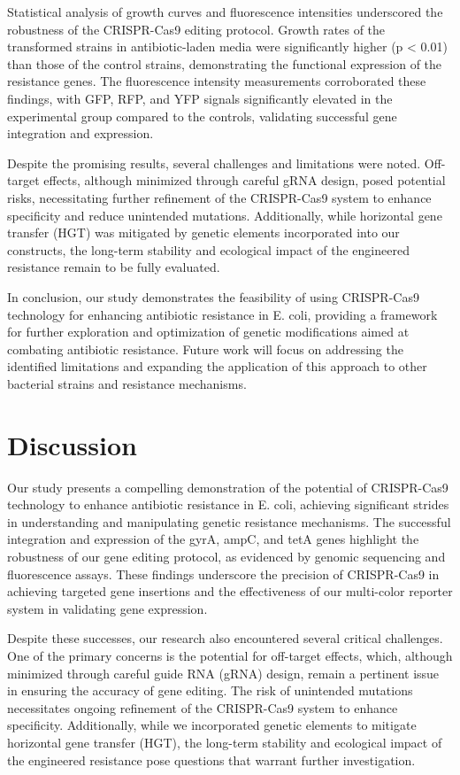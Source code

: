 \documentclass{article}
\begin{document}
Statistical analysis of growth curves and fluorescence intensities underscored the robustness of the CRISPR-Cas9 editing protocol. Growth rates of the transformed strains in antibiotic-laden media were significantly higher (p < 0.01) than those of the control strains, demonstrating the functional expression of the resistance genes. The fluorescence intensity measurements corroborated these findings, with GFP, RFP, and YFP signals significantly elevated in the experimental group compared to the controls, validating successful gene integration and expression.

Despite the promising results, several challenges and limitations were noted. Off-target effects, although minimized through careful gRNA design, posed potential risks, necessitating further refinement of the CRISPR-Cas9 system to enhance specificity and reduce unintended mutations. Additionally, while horizontal gene transfer (HGT) was mitigated by genetic elements incorporated into our constructs, the long-term stability and ecological impact of the engineered resistance remain to be fully evaluated.

In conclusion, our study demonstrates the feasibility of using CRISPR-Cas9 technology for enhancing antibiotic resistance in E. coli, providing a framework for further exploration and optimization of genetic modifications aimed at combating antibiotic resistance. Future work will focus on addressing the identified limitations and expanding the application of this approach to other bacterial strains and resistance mechanisms.

\section{Discussion}
Our study presents a compelling demonstration of the potential of CRISPR-Cas9 technology to enhance antibiotic resistance in E. coli, achieving significant strides in understanding and manipulating genetic resistance mechanisms. The successful integration and expression of the gyrA, ampC, and tetA genes highlight the robustness of our gene editing protocol, as evidenced by genomic sequencing and fluorescence assays. These findings underscore the precision of CRISPR-Cas9 in achieving targeted gene insertions and the effectiveness of our multi-color reporter system in validating gene expression.

Despite these successes, our research also encountered several critical challenges. One of the primary concerns is the potential for off-target effects, which, although minimized through careful guide RNA (gRNA) design, remain a pertinent issue in ensuring the accuracy of gene editing. The risk of unintended mutations necessitates ongoing refinement of the CRISPR-Cas9 system to enhance specificity. Additionally, while we incorporated genetic elements to mitigate horizontal gene transfer (HGT), the long-term stability and ecological impact of the engineered resistance pose questions that warrant further investigation.
\end{document}
